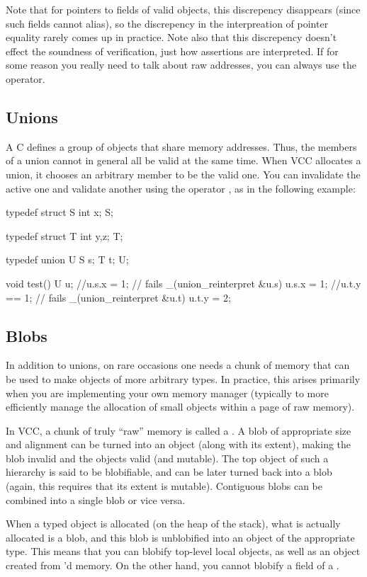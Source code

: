 \noindent Note that for pointers to fields of valid objects, this
discrepency disappears (since such fields cannot alias), so the
discrepency in the interpreation of pointer equality rarely comes up
in practice. Note also that this discrepency doesn't effect the
soundness of verification, just how assertions are interpreted. If for
some reason you really need to talk about raw addresses, you can
always use the \vcc{\addr} operator.

\subsection{Unions}
A C  defines a group of objects that share memory addresses. Thus,
the members of a union cannot in general all be valid at the same
time. When VCC allocates a union, it chooses an arbitrary member to be
the valid one. You can invalidate the active one and validate another
using the operator
, as in the following example:
\begin{VCC}
typedef struct S {
	int x;
} S;

typedef struct T {
	int y,z;
} T;

typedef union U {
	S s;
	T t;
} U;

void test() {
  U u;
  //u.s.x = 1;              // fails
  _(union_reinterpret &u.s) 
  u.s.x = 1;
  //u.t.y == 1;             // fails
  _(union_reinterpret &u.t)
  u.t.y = 2;
}
\end{VCC}

\subsection{Blobs}

In addition to unions, on rare occasions one needs a chunk of memory
that can be used to make objects of more arbitrary types. In practice,
this arises primarily when you are implementing your own memory
manager (typically to more efficiently manage the allocation of small
objects within a page of raw memory).

In VCC, a chunk of truly ``raw'' memory is called a . A blob
of appropriate size and alignment can be turned into an object (along
with its extent), making the blob invalid and the objects valid (and
mutable). The top object of such a hierarchy is said to be
blobifiable, and can be later turned back into a blob (again, this
requires that its extent is mutable).  Contiguous blobs can be
combined into a single blob or vice versa.

When a typed object is allocated (on the heap of the stack), what is
actually allocated is a blob, and this blob is unblobified into an
object of the appropriate type. This means that you can blobify
top-level local objects, as well as an object created from
'd memory. On the other hand, you cannot blobify a field
of a .



